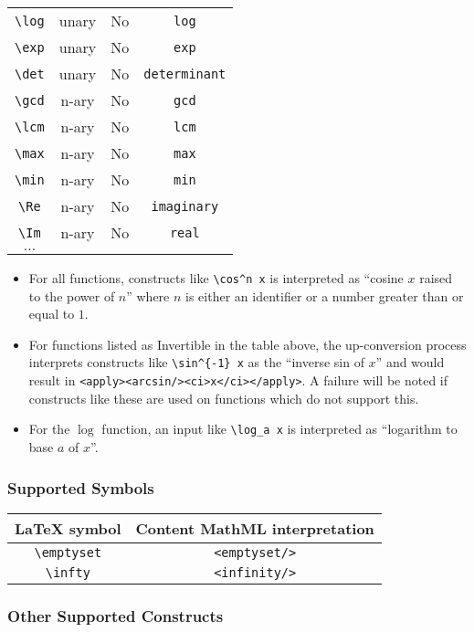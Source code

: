 \begin{tabular}{|c|c|c|c|}
\verb|\log| & unary & No & \verb|log| \\
\verb|\exp| & unary & No & \verb|exp| \\
\verb|\det| & unary & No & \verb|determinant| \\
\verb|\gcd| & n-ary & No & \verb|gcd| \\
\verb|\lcm| & n-ary & No & \verb|lcm| \\
\verb|\max| & n-ary & No & \verb|max| \\
\verb|\min| & n-ary & No & \verb|min| \\
\verb|\Re| & n-ary & No & \verb|imaginary| \\
\verb|\Im| & n-ary & No & \verb|real| \\
$\ldots$ & & & \\
\hline
\end{tabular}

\begin{itemize}
\item
  For all functions, constructs like \verb|\cos^n x| is
  interpreted as ``cosine $x$ raised to the power of $n$''
  where $n$ is either an identifier or a number greater than
  or equal to $1$.

\item
  For functions listed as Invertible in the table above,
  the up-conversion process interprets constructs like
  \verb|\sin^{-1} x| as the ``inverse sin of $x$''
  and would result in \verb|<apply><arcsin/><ci>x</ci></apply>|.
  A failure will be noted if constructs like these are
  used on functions which do not support this.

\item
  For the $\log$ function, an input like \verb|\log_a x|
  is interpreted as ``logarithm to base $a$ of $x$''.
\end{itemize}

\subsubsection*{Supported Symbols}

\begin{tabular}{|c|c|}
\hline
LaTeX symbol & Content MathML interpretation \\
\hline
\verb|\emptyset| & \verb|<emptyset/>| \\
\verb|\infty| & \verb|<infinity/>| \\
\hline
\end{tabular}

\subsubsection*{Other Supported Constructs}

